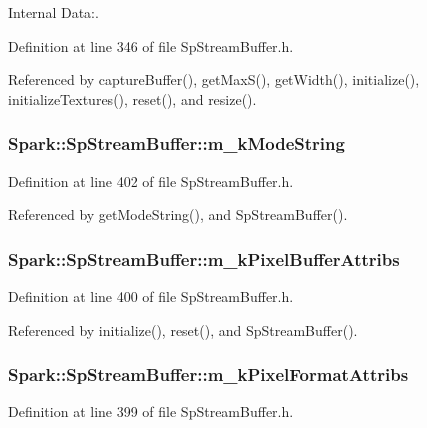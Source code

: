 Internal Data:. 

Definition at line 346 of file Sp\-Stream\-Buffer.h.

Referenced by capture\-Buffer(), get\-Max\-S(), get\-Width(), initialize(), initialize\-Textures(), reset(), and resize().
\subsubsection{ {\bf Spark::Sp\-Stream\-Buffer::m\_\-k\-Mode\-String}\hspace{0.3cm}{\tt  [protected]}}\label{classSpark_1_1SpStreamBuffer_p32}


Definition at line 402 of file Sp\-Stream\-Buffer.h.

Referenced by get\-Mode\-String(), and Sp\-Stream\-Buffer().
\subsubsection{ {\bf Spark::Sp\-Stream\-Buffer::m\_\-k\-Pixel\-Buffer\-Attribs}\hspace{0.3cm}{\tt  [protected]}}\label{classSpark_1_1SpStreamBuffer_p31}


Definition at line 400 of file Sp\-Stream\-Buffer.h.

Referenced by initialize(), reset(), and Sp\-Stream\-Buffer().
\subsubsection{ {\bf Spark::Sp\-Stream\-Buffer::m\_\-k\-Pixel\-Format\-Attribs}\hspace{0.3cm}{\tt  [protected]}}\label{classSpark_1_1SpStreamBuffer_p30}


Definition at line 399 of file Sp\-Stream\-Buffer.h.

